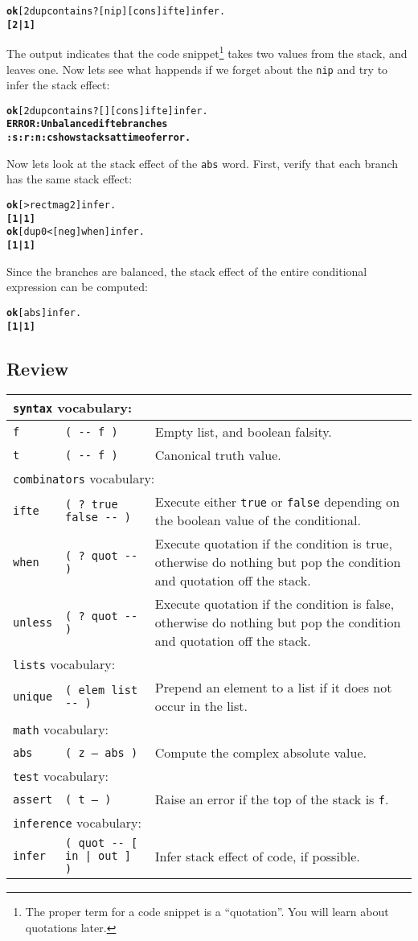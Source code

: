 \documentclass[english]{book}
\newcommand{\wordtable}[1]{{
\begin{tabularx}{12cm}{|l l X|}
#1
\hline
\end{tabularx}}}
\newcommand{\tabvocab}[1]{
\hline
\multicolumn{3}{|l|}{
\rule[-2mm]{0mm}{6mm}
\texttt{#1} vocabulary:}
\\
\hline
}
\begin{document}
\begin{alltt}
\textbf{ok} [ 2dup contains? [ nip ] [ cons ] ifte ] infer .
\textbf{[ 2 | 1 ]}
\end{alltt}

The output indicates that the code snippet\footnote{The proper term for a code snippet is a ``quotation''. You will learn about quotations later.} takes two values from the stack, and leaves one. Now lets see what happends if we forget about the \texttt{nip} and try to infer the stack effect:

\begin{alltt}
\textbf{ok} [ 2dup contains? [ ] [ cons ] ifte ] infer .
\textbf{ERROR: Unbalanced ifte branches
:s :r :n :c show stacks at time of error.}
\end{alltt}

Now lets look at the stack effect of the \texttt{abs} word. First, verify that each branch has the same stack effect:
 
\begin{alltt}
\textbf{ok} [ >rect mag2 ] infer .
\textbf{[ 1 | 1 ]}
\textbf{ok} [ dup 0 < [ neg ] when ] infer .
\textbf{[ 1 | 1 ]}
\end{alltt}

Since the branches are balanced, the stack effect of the entire conditional expression can be computed:

\begin{alltt}
\textbf{ok} [ abs ] infer .
\textbf{[ 1 | 1 ]}
\end{alltt}

\subsection*{Review}

\wordtable{
\tabvocab{syntax}
\texttt{f}&
\texttt{( -{}- f )}&
Empty list, and boolean falsity.\\
\texttt{t}&
\texttt{( -{}- f )}&
Canonical truth value.\\
\tabvocab{combinators}
\texttt{ifte}&
\texttt{( ?~true false -{}- )}&
Execute either \texttt{true} or \texttt{false} depending on the boolean value of the conditional.\\
\texttt{when}&
\texttt{( ?~quot -{}- )}&
Execute quotation if the condition is true, otherwise do nothing but pop the condition and quotation off the stack.\\
\texttt{unless}&
\texttt{( ?~quot -{}- )}&
Execute quotation if the condition is false, otherwise do nothing but pop the condition and quotation off the stack.\\
\tabvocab{lists}
\texttt{unique}&
\texttt{( elem list -{}- )}&
Prepend an element to a list if it does not occur in the
list.\\
\tabvocab{math}
\texttt{abs}&
\texttt{( z -- abs )}&
Compute the complex absolute value.\\
\tabvocab{test}
\texttt{assert}&
\texttt{( t -- )}&
Raise an error if the top of the stack is \texttt{f}.\\
\tabvocab{inference}
\texttt{infer}&
\texttt{( quot -{}- {[} in | out {]} )}&
Infer stack effect of code, if possible.\\}
\end{document}
